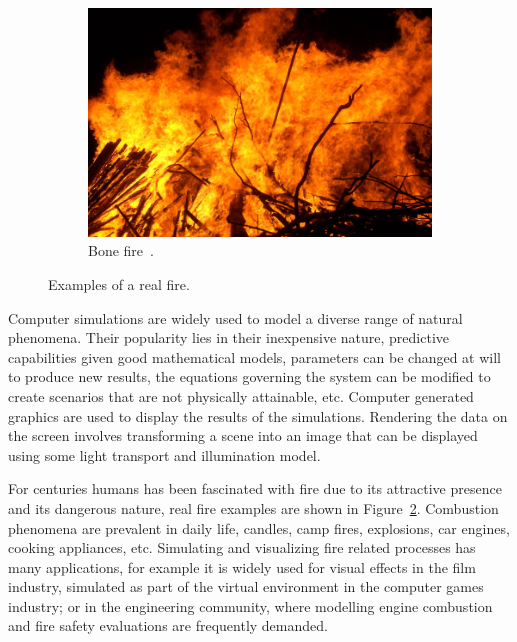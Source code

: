 \begin{figure}[htpb!]
        ~ %
        \begin{subfigure}[t]{0.55\textwidth}
                \includegraphics[width=\textwidth]{img/real_fire2}
                \caption{Bone fire~\cite{real_fire2}.}
                \label{fig:real_fire2}
        \end{subfigure}
        \caption{Examples of a real fire.}\label{fig:real_fires}
\end{figure}

Computer simulations are widely used to model a diverse range of natural phenomena.
Their popularity lies in their inexpensive nature, predictive capabilities given good mathematical models, parameters can be changed at will to produce new results, the equations governing the system can be modified to create scenarios that are not physically attainable, etc.
Computer generated graphics are used to display the results of the simulations.
Rendering the data on the screen involves transforming a scene into an image that can be displayed using some light transport and illumination model.

For centuries humans has been fascinated with fire due to its attractive presence and its dangerous nature, real fire examples are shown in Figure~\ref{fig:real_fires}.
Combustion phenomena are prevalent in daily life, candles, camp fires, explosions, car engines, cooking appliances, etc.
Simulating and visualizing fire related processes has many applications, for example it is widely used for visual effects in the film industry, simulated as part of the virtual environment in the computer games industry; or in the engineering community, where modelling engine combustion and fire safety evaluations are frequently demanded.

